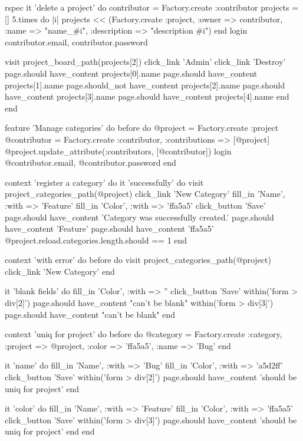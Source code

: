 \begin{mycode}{rspec}
  it 'delete a project' do
    contributor = Factory.create :contributor
    projects = []
    5.times do |i|
      projects << (Factory.create :project, :owner => contributor,
                                :name => "name_#{i}", :description => "description #{i}")
    end
    login contributor.email, contributor.password

    visit project_board_path(projects[2])
    click_link 'Admin'
    click_link 'Destroy'
    page.should have_content projects[0].name
    page.should have_content projects[1].name
    page.should_not have_content projects[2].name
    page.should have_content projects[3].name
    page.should have_content projects[4].name
  end
end

feature 'Manage categories' do
  before do
    @project = Factory.create :project
    @contributor = Factory.create :contributor, :contributions => [@project]
    @project.update_attribute(:contributors, [@contributor])
    login @contributor.email, @contributor.password
  end

  context 'register a category' do
    it 'successfully' do
      visit project_categories_path(@project)
      click_link 'New Category'
      fill_in 'Name', :with => 'Feature'
      fill_in 'Color', :with => 'ffa5a5'
      click_button 'Save'
      page.should have_content 'Category was successfully created.'
      page.should have_content 'Feature'
      page.should have_content 'ffa5a5'
      @project.reload.categories.length.should == 1
    end

    context 'with error' do
      before do
        visit project_categories_path(@project)
        click_link 'New Category'
      end

      it 'blank fields' do
        fill_in 'Color', :with => ''
        click_button 'Save'
        within('form > div[2]') { page.should have_content "can't be blank" }
        within('form > div[3]') { page.should have_content "can't be blank" }
      end

      context 'uniq for project' do
        before do
          @category = Factory.create :category, :project => @project,
                                       :color => 'ffa5a5', :name => 'Bug'
        end

        it 'name' do
          fill_in 'Name', :with => 'Bug'
          fill_in 'Color', :with => 'a5d2ff'
          click_button 'Save'
          within('form > div[2]') { page.should have_content 'should be uniq for project' }
        end

        it 'color' do
          fill_in 'Name', :with => 'Feature'
          fill_in 'Color', :with => 'ffa5a5'
          click_button 'Save'
          within('form > div[3]') { page.should have_content 'should be uniq for project' }
        end
      end


\end{mycode}
